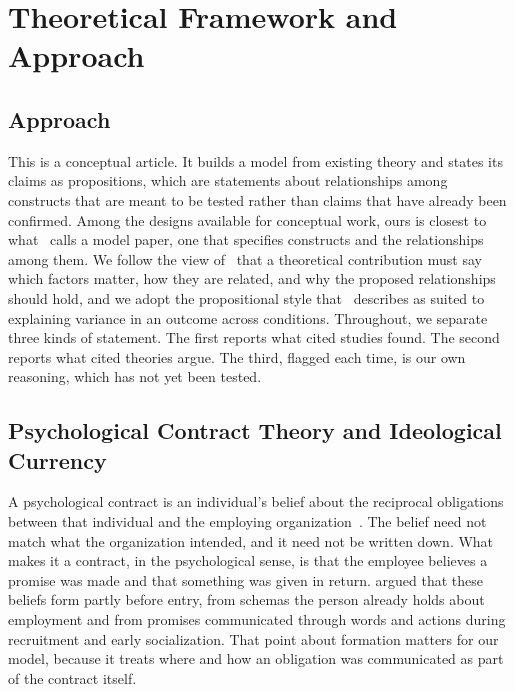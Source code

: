 \documentclass[12pt,a4paper]{article}
\theoremstyle{definition}
\begin{document}
\section{Theoretical Framework and Approach}
\subsection{Approach}

This is a conceptual article. It builds a model from existing theory and states its claims as propositions, which are statements about relationships among constructs that are meant to be tested rather than claims that have already been confirmed. Among the designs available for conceptual work, ours is closest to what~\citet{jaakkola2020designing} calls a model paper, one that specifies constructs and the relationships among them. We follow the view of~\citet{whetten1989constitutes} that a theoretical contribution must say which factors matter, how they are related, and why the proposed relationships should hold, and we adopt the propositional style that~\citet{cornelissen2017developing} describes as suited to explaining variance in an outcome across conditions. Throughout, we separate three kinds of statement. The first reports what cited studies found. The second reports what cited theories argue. The third, flagged each time, is our own reasoning, which has not yet been tested.

\subsection{Psychological Contract Theory and Ideological Currency}

A psychological contract is an individual's belief about the reciprocal obligations between that individual and the employing organization~\citep{rousseau1989psychological}. The belief need not match what the organization intended, and it need not be written down. What makes it a contract, in the psychological sense, is that the employee believes a promise was made and that something was given in return. \citet{rousseau2001schema} argued that these beliefs form partly before entry, from schemas the person already holds about employment and from promises communicated through words and actions during recruitment and early socialization. That point about formation matters for our model, because it treats where and how an obligation was communicated as part of the contract itself.
\end{document}
